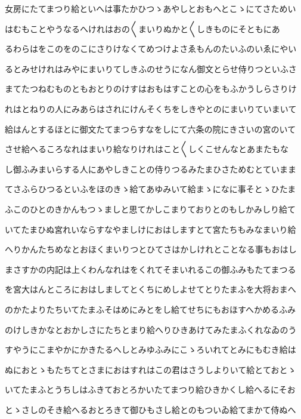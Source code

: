 \documentclass[a4paper,11pt,landscape]{ltjtarticle}
\begin{document}
\par\medskip
女房にたてまつり給といへは事たかひつゝあやしとおもへとこゝにてさためい
\par\medskip
はむもことやうなるへけれはおの〱まいりぬかと〱しきものにそともにあ
\par\medskip
るわらはをこのをのこにさりけなくてめつけよさゑもんのたいふのいゑにやい
\par\medskip
るとみせけれはみやにまいりてしきふのせうになん御文とらせ侍りつといふさ
\par\medskip
まてたつねむものともおとりのけすはおもはすことの心をもふかうしらさりけ
\par\medskip
れはとねりの人にみあらはされにけんそくちをしきやとのにまいりていまいて
\par\medskip
給はんとするほとに御文たてまつらすなをしにて六条の院にきさいの宮のいて
\par\medskip
させ給へるころなれはまいり給なりけれはこと〱しくこせんなとあまたもな
\par\medskip
し御ふみまいらする人にあやしきことの侍りつるみたまひさためむとていまま
\par\medskip
てさふらひつるといふをほのきゝ給てあゆみいて給まゝになに事そとゝひたま
\par\medskip
ふこのひとのきかんもつゝましと思てかしこまりておりとのもしかみしり給て
\par\medskip
いてたまひぬ宮れいならすなやましけにおはしますとて宮たちもみなまいり給
\par\medskip
へりかんたちめなとおほくまいりつとひてさはかしけれとことなる事もおはし
\par\medskip
まさすかの内記は上くわんなれはをくれてそまいれるこの御ふみもたてまつる
\par\medskip
を宮大はんところにおはしましてとくちにめしよせてとりたまふを大将おまへ
\par\medskip
のかたよりたちいてたまふそはめにみとをし給てせちにもおほすへかめるふみ
\par\medskip
のけしきかなとおかしさにたちとまり給へりひきあけてみたまふくれなゐのう
\par\medskip
すやうにこまやかにかきたるへしとみゆふみにこゝろいれてとみにもむき給は
\par\medskip
ぬにおとゝもたちてとさまにおはすれはこの君はさうしよりいて給とておとゝ
\par\medskip
いてたまふとうちしはふきておとろかいたてまつり給ひきかくし給へるにそお
\par\medskip
とゝさしのそき給へるおとろきて御ひもさし給とのもついゐ給てまかて侍ぬへ
\par\medskip
\end{document}
